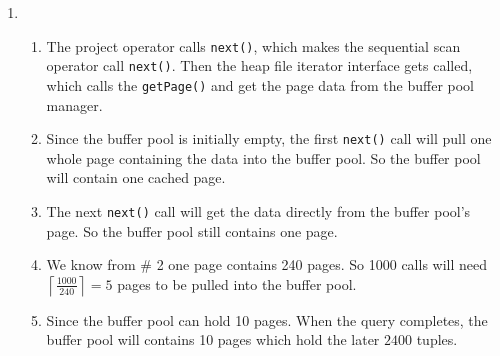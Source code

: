 \documentclass[10pt]{article}
\begin{document}
\begin{enumerate}[label=\textbf{\arabic*.}, listparindent=0.0em, itemsep=1em]
    \item 
    \begin{enumerate}[listparindent=0.0em, itemsep=1em]
    \item 
    The project operator calls \texttt{next()}, which makes the sequential scan operator call \texttt{next()}. Then the heap file iterator interface gets called, which calls the \texttt{getPage()} and get the page data from the buffer pool manager.
    \item Since the buffer pool is initially empty, the first \texttt{next()} call will pull one whole page containing the data into the buffer pool. So the buffer pool will contain one cached page.
    \item The next \texttt{next()} call will get the data directly from the buffer pool's page. So the buffer pool still contains one page.
    \item We know from \# 2 one page contains 240 pages. So 1000 calls will need $\left\lceil\frac{1000}{240}\right\rceil = 5$ pages to be pulled into the buffer pool.
    \item Since the buffer pool can hold 10 pages. When the query completes, the buffer pool will contains 10 pages which hold the later $2400$ tuples.
    \end{enumerate} 
    \end{enumerate}
\end{document}
